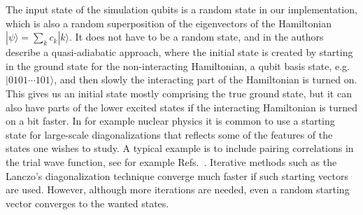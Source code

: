 \documentclass[aps,pra,twocolumn,floatfix]{revtex4}
\begin{document}
The input state of the simulation qubits is a random state in our
implementation, which is
also a random superposition of the eigenvectors of the Hamiltonian
$|\psi\rangle=\sum_k c_k | k\rangle$. It does not have to be a random state,
and in \cite{lawu2002} the authors describe a quasi-adiabatic
approach, where the initial state is created by starting in the ground 
state for the non-interacting Hamiltonian, 
a qubit basis state, e.g. $|0101\cdots101\rangle$, 
and
then slowly the interacting part of the Hamiltonian is turned on.
This gives us an initial state mostly comprising the true ground state,
but it can also have parts of the lower excited states if the
interacting Hamiltonian is turned on a bit faster.
In for example nuclear physics it is common to use a starting state for large-scale
diagonalizations that reflects some of the features of the states one wishes to study.
A typical example is to include pairing correlations in the trial wave function, see
for example Refs.~\cite{caurier2005,rmp75mhj}.
Iterative methods such as the Lanczo's diagonalization technique  \cite{Whitehead1977,golub1996}
converge much faster if such starting vectors are used. However, although more iterations are needed,
even a random starting vector converges to the wanted states.
 
\end{document}
